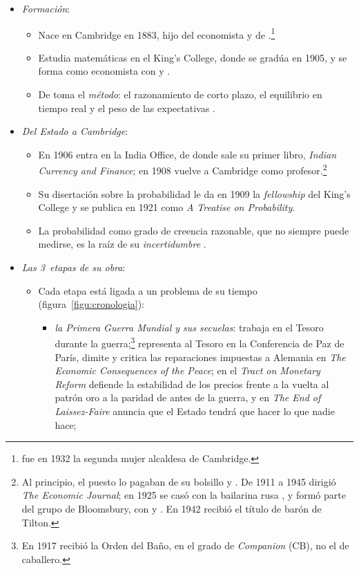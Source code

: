 \documentclass[11pt]{article}
\begin{document}
\begin{itemize}
\item \emph{Formación}:
  \begin{itemize}
  \item Nace en Cambridge en 1883, hijo del economista  y de .\footnote{ fue en 1932 la segunda mujer alcaldesa de Cambridge.}
  \item Estudia matemáticas en el King's College, donde se gradúa en 1905, y se forma como economista con  y .
  \item De  toma el \emph{método}: el razonamiento de corto plazo, el equilibrio en tiempo real y el peso de las expectativas  .
  \end{itemize}
\item \emph{Del Estado a Cambridge}:
  \begin{itemize}
  \item En 1906 entra en la India Office, de donde sale su primer libro, \emph{Indian Currency and Finance}\nocite{Keynes1913Indian}; en 1908 vuelve a Cambridge como profesor.\footnote{Al principio, el puesto lo pagaban de su bolsillo  y . De 1911 a 1945 dirigió \emph{The Economic Journal}; en 1925 se casó con la bailarina rusa , y formó parte del grupo de Bloomsbury, con  y . En 1942 recibió el título de barón  de Tilton.}
  \item Su disertación sobre la probabilidad le da en 1909 la \emph{fellowship} del King's College y se publica en 1921 como \emph{A Treatise on Probability}\nocite{Keynes1921Treatise}.
  \item La probabilidad como grado de creencia razonable, que no siempre puede medirse, es la raíz de su \emph{incertidumbre} .
  \end{itemize}
\item \emph{Las 3~etapas de su obra}:
  \begin{itemize}
  \item Cada etapa está ligada a un problema de su tiempo\nocite{Roncaglia2006Riqueza} (figura~\ref{figu:cronologia}):
  \begin{itemize}
  \item \emph{la Primera Guerra Mundial y sus secuelas}: trabaja en el Tesoro durante la guerra;\footnote{En 1917 recibió la Orden del Baño, en el grado de \emph{Companion} (CB), no el de caballero.} representa al Tesoro en la Conferencia de Paz de París, dimite y critica las reparaciones impuestas a Alemania en \emph{The Economic Consequences of the Peace}\nocite{Keynes1919Economic}; en el \emph{Tract on Monetary Reform}\nocite{Keynes1923Tract} defiende la estabilidad de los precios frente a la vuelta al patrón oro a la paridad de antes de la guerra, y en \emph{The End of Laissez-Faire}\nocite{Keynes1926End} anuncia que el Estado tendrá que hacer lo que nadie hace;

\end{itemize}
\end{itemize}
\end{itemize}
\end{document}
